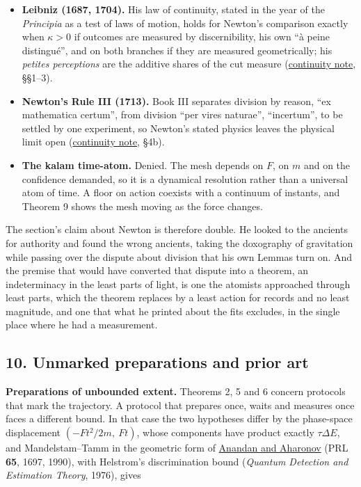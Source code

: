 \documentclass[11pt,a4paper]{article}
\begin{document}
\begin{itemize}
\item
  \textbf{Leibniz (1687, 1704).} His law of continuity, stated in the
  year of the \emph{Principia} as a test of laws of motion, holds for
  Newton's comparison exactly when \(\kappa>0\) if outcomes are measured
  by discernibility, his own ``à peine distingué'', and on both branches
  if they are measured geometrically; his \emph{petites perceptions} are
  the additive shares of the cut measure
  (\href{leibniz-continuity-records.md}{continuity note}, §§1--3).
\item
  \textbf{Newton's Rule III (1713).} Book III separates division by
  reason, ``ex mathematica certum'', from division ``per vires
  naturae'', ``incertum'', to be settled by one experiment, so Newton's
  stated physics leaves the physical limit open
  (\href{leibniz-continuity-records.md}{continuity note}, §4b).
\item
  \textbf{The kalam time-atom.} Denied. The mesh depends on \(F\), on
  \(m\) and on the confidence demanded, so it is a dynamical resolution
  rather than a universal atom of time. A floor on action coexists with
  a continuum of instants, and Theorem 9 shows the mesh moving as the
  force changes.
\end{itemize}

The section's claim about Newton is therefore double. He looked to the
ancients for authority and found the wrong ancients, taking the
doxography of gravitation while passing over the dispute about division
that his own Lemmas turn on. And the premise that would have converted
that dispute into a theorem, an indeterminacy in the least parts of
light, is one the atomists approached through least parts, which the
theorem replaces by a least action for records and no least magnitude,
and one that what he printed about the fits excludes, in the single
place where he had a measurement.

\hypertarget{unmarked-preparations-and-prior-art}{%
\subsection{10. Unmarked preparations and prior
art}\label{unmarked-preparations-and-prior-art}}

\textbf{Preparations of unbounded extent.} Theorems 2, 5 and 6 concern
protocols that mark the trajectory. A protocol that prepares once, waits
and measures once faces a different bound. In that case the two
hypotheses differ by the phase-space displacement \((-F t^2/2m,\ Ft)\),
whose components have product exactly \(\tau\Delta E\), and
Mandelstam--Tamm in the geometric form of
\href{https://doi.org/10.1103/PhysRevLett.65.1697}{Anandan and Aharonov}
(PRL \textbf{65}, 1697, 1990), with Helstrom's discrimination bound
(\emph{Quantum Detection and Estimation Theory}, 1976), gives
\end{document}
